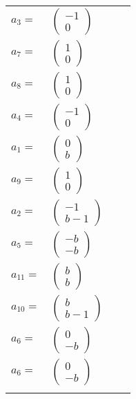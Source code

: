 \documentclass[1p]{elsarticle_modified}
\theoremstyle{definition}
\begin{document}
\begin{tabular}{m{7pt} m{180pt} m{7pt} m{180pt} }
\flushright $a_{3}=$&$\begin{pmatrix}-1\\0\end{pmatrix}$ \\
\flushright $a_{7}=$&$\begin{pmatrix}1\\0\end{pmatrix}$ \\
\flushright $a_{8}=$&$\begin{pmatrix}1\\0\end{pmatrix}$ \\
\flushright $a_{4}=$&$\begin{pmatrix}-1\\0\end{pmatrix}$ \\
\flushright $a_{1}=$&$\begin{pmatrix}0\\b\end{pmatrix}$ \\
\flushright $a_{9}=$&$\begin{pmatrix}1\\0\end{pmatrix}$ \\
\flushright $a_{2}=$&$\begin{pmatrix}-1\\b-1\end{pmatrix}$ \\
\flushright $a_{5}=$&$\begin{pmatrix}- b\\- b\end{pmatrix}$ \\
\flushright $a_{11}=$&$\begin{pmatrix}b\\b\end{pmatrix}$ \\
\flushright $a_{10}=$&$\begin{pmatrix}b\\b-1\end{pmatrix}$ \\
\flushright $a_{6}=$&$\begin{pmatrix}0\\- b\end{pmatrix}$\\ \flushright $a_{6}=$&$\begin{pmatrix}0\\- b\end{pmatrix}$\\&\end{tabular}
\end{document}
